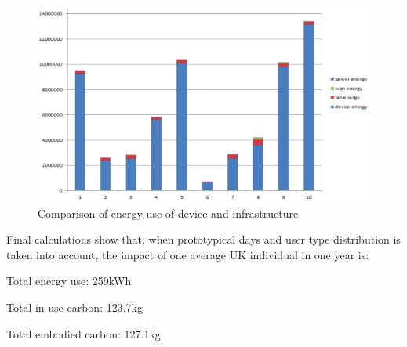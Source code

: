 \documentclass[conference]{IEEEtran}
\begin{document}
\begin{figure}[!htp]
\centering
\includegraphics[width=0.9\columnwidth]{images/energyuse_comparison.png}
\caption{Comparison of energy use of device and infrastructure}
\label{fig:energyusecomparison} 
\end{figure}


Final calculations show that, when prototypical days and user type
distribution is taken into account, the impact of one average UK
individual in one year is:

\begin{compactdesc}
\item[Total energy use:] 259kWh
\item[Total in use carbon:] 123.7kg
\item[Total embodied carbon:] 127.1kg
\end{compactdesc}




\end{document}
